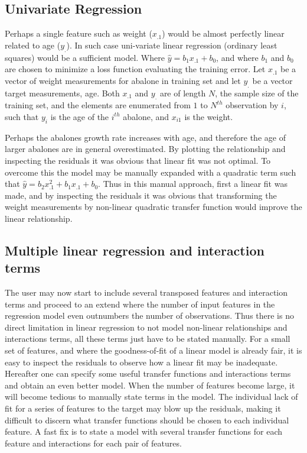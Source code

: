 \subsection{Univariate Regression}
Perhaps a single feature such as weight ($x_{.1}$) would be almost perfectly linear related to age ($y_.$). In such case uni-variate linear regression (ordinary least squares) would be a sufficient model. Where $\hat{y} = b_1 x_{.1} + b_0$, and where $b_1$ and $b_0$ are chosen to minimize a loss function evaluating the training error. Let $x_{.1}$ be a vector of weight measurements for abalone in training set and let $y_.$ be a vector target measurements, age. Both $x_.1$ and $y_.$ are of length $N$, the sample size of the training set, and the elements are enumerated from $1$ to $N^{th}$ observation by $i$, such that $y_i$ is the age of the $i^{th}$ abalone, and $x_{i1}$ is the weight.

Perhaps the abalones growth rate increases with age, and therefore the age of larger abalones are in general overestimated. By plotting the relationship and inspecting the residuals it was obvious that linear fit was not optimal. To overcome this the model may be manually expanded with a quadratic term such that $\hat{y} = b_2 x_{.1}^2 + b_1 x_{.1} + b_0$.  Thus in this manual approach, first a linear fit was made, and by inspecting the residuals it was obvious that transforming the weight measurements by non-linear quadratic transfer function would improve the linear relationship.

\subsection{Multiple linear regression and interaction terms}
The user may now start to include several transposed features and interaction terms and proceed to an extend where the number of input features in the regression model even outnumbers the number of observations. Thus there is no direct limitation in linear regression to not model non-linear relationships and interactions terms, all these terms just have to be stated manually. For a small set of features, and where the goodness-of-fit of a linear model is already fair, it is easy to inspect the residuals to observe how a linear fit may be inadequate. Hereafter one can specify some useful transfer functions and interactions terms and obtain an even better model. When the number of features become large, it will become tedious to manually state terms in the model. The individual lack of fit for a series of features to the target may blow up the residuals, making it difficult to discern what transfer functions should be chosen to each individual feature. A fast fix is to state a model with several transfer functions for each feature and interactions for each pair of features.

